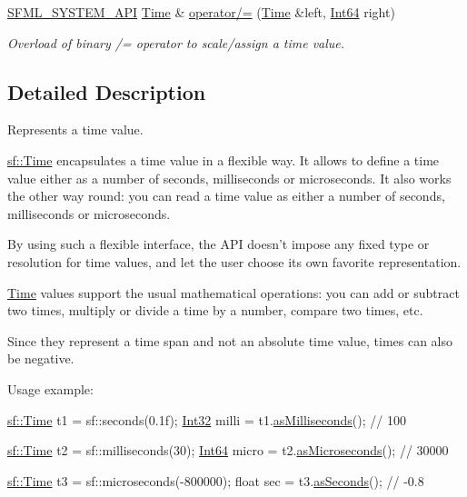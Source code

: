 \begin{DoxyCompactItemize}
\hyperlink{_system_2_export_8hpp_a6476c9e422606477a4c23d92b1d79a1f}{S\-F\-M\-L\-\_\-\-S\-Y\-S\-T\-E\-M\-\_\-\-A\-P\-I} \hyperlink{classsf_1_1_time}{Time} \& \hyperlink{classsf_1_1_time_ad51871e3db77def834ae8688e64504ff}{operator/=} (\hyperlink{classsf_1_1_time}{Time} \&left, \hyperlink{namespacesf_a2840579fed3494d9f330baf7a5a19903}{Int64} right)
\begin{DoxyCompactList}\small\item\em Overload of binary /= operator to scale/assign a time value. \end{DoxyCompactList}\end{DoxyCompactItemize}


\subsection{Detailed Description}
Represents a time value. 

\hyperlink{classsf_1_1_time}{sf\-::\-Time} encapsulates a time value in a flexible way. It allows to define a time value either as a number of seconds, milliseconds or microseconds. It also works the other way round\-: you can read a time value as either a number of seconds, milliseconds or microseconds.

By using such a flexible interface, the A\-P\-I doesn't impose any fixed type or resolution for time values, and let the user choose its own favorite representation.

\hyperlink{classsf_1_1_time}{Time} values support the usual mathematical operations\-: you can add or subtract two times, multiply or divide a time by a number, compare two times, etc.

Since they represent a time span and not an absolute time value, times can also be negative.

Usage example\-: 
\begin{DoxyCode}
\hyperlink{classsf_1_1_time}{sf::Time} t1 = sf::seconds(0.1f);
\hyperlink{namespacesf_ac2dfd4952377a26dee4750e2e4a30a15}{Int32} milli = t1.\hyperlink{classsf_1_1_time_a85e6deb41fa71896508ce0f64059a6ae}{asMilliseconds}(); \textcolor{comment}{// 100}

\hyperlink{classsf_1_1_time}{sf::Time} t2 = sf::milliseconds(30);
\hyperlink{namespacesf_a2840579fed3494d9f330baf7a5a19903}{Int64} micro = t2.\hyperlink{classsf_1_1_time_ae41a7e0ca73ceea771b3c150c12abdd2}{asMicroseconds}(); \textcolor{comment}{// 30000}

\hyperlink{classsf_1_1_time}{sf::Time} t3 = sf::microseconds(-800000);
\textcolor{keywordtype}{float} sec = t3.\hyperlink{classsf_1_1_time_a7538140d095e48da9d7eee015dd455a9}{asSeconds}(); \textcolor{comment}{// -0.8}
\end{DoxyCode}



